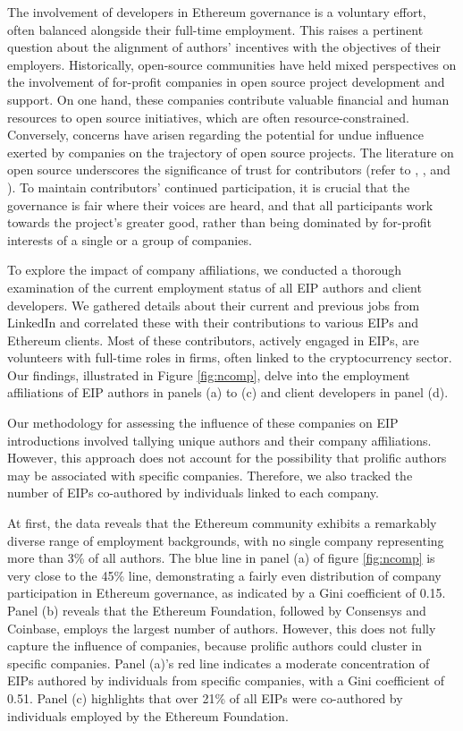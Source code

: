 \documentclass[No]{AEA}
\begin{document}
The involvement of developers in Ethereum governance is a voluntary effort, often balanced alongside their full-time employment. This raises a pertinent question about the alignment of authors' incentives with the objectives of their employers. Historically, open-source communities have held mixed perspectives on the involvement of for-profit companies in open source project development and support. On one hand, these companies contribute valuable financial and human resources to open source initiatives, which are often resource-constrained. Conversely, concerns have arisen regarding the potential for undue influence exerted by companies on the trajectory of open source projects. The literature on open source underscores the significance of trust for contributors (refer to \cite{Jarvenpaaetal2004}, \cite{Korsgaardetal1995}, and \cite{StewartGosain2006}). To maintain contributors' continued participation, it is crucial that the governance is fair where their voices are heard, and that all participants work towards the project's greater good, rather than being dominated by for-profit interests of a single or a group of companies.

To explore the impact of company affiliations, we conducted a thorough examination of the current employment status of all EIP authors and client developers. We gathered details about their current and previous jobs from LinkedIn and correlated these with their contributions to various EIPs and Ethereum clients. Most of these contributors, actively engaged in EIPs, are volunteers with full-time roles in firms, often linked to the cryptocurrency sector. Our findings, illustrated in Figure \ref{fig:ncomp}, delve into the employment affiliations of EIP authors in panels (a) to (c) and client developers in panel (d).

Our methodology for assessing the influence of these companies on EIP introductions involved tallying unique authors and their company affiliations. However, this approach does not account for the possibility that prolific authors may be associated with specific companies. Therefore, we also tracked the number of EIPs co-authored by individuals linked to each company.

At first, the data reveals that the Ethereum community exhibits a remarkably diverse range of employment backgrounds, with no single company representing more than 3\% of all authors. The blue line in panel (a) of figure \ref{fig:ncomp} is very close to the 45\% line, demonstrating a fairly even distribution of company participation in Ethereum governance, as indicated by a Gini coefficient of 0.15. Panel (b) reveals that the Ethereum Foundation, followed by Consensys and Coinbase, employs the largest number of authors. However, this does not fully capture the influence of companies, because prolific authors could cluster in specific companies. Panel (a)'s red line indicates a moderate concentration of EIPs authored by individuals from specific companies, with a Gini coefficient of 0.51. Panel (c) highlights that over 21\% of all EIPs were co-authored by individuals employed by the Ethereum Foundation. 
\end{document}
